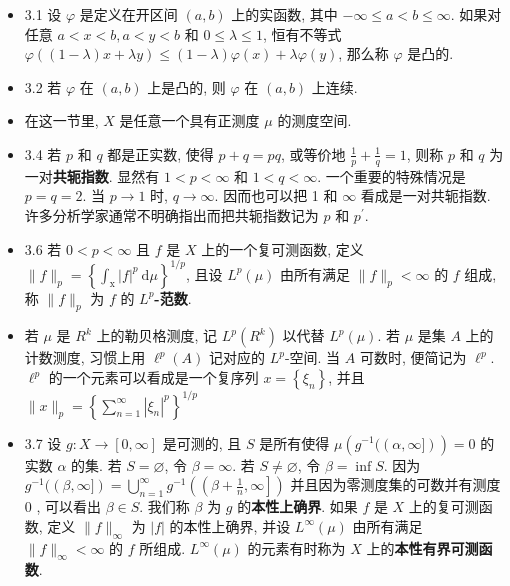 \begin{itemize}
\item 3.1 设 $\varphi$ 是定义在开区间 $(a, b)$ 上的实函数, 其中 $-\infty \leqslant a<b \leqslant \infty$. 如果对任意 $a<x<b, a<y<b$ 和 $0 \leqslant \lambda \leqslant 1$, 恒有不等式 $\varphi((1-\lambda) x+\lambda y) \leqslant(1-\lambda) \varphi(x)+\lambda \varphi(y)$, 那么称 $\varphi$ 是凸的.

\item 3.2 若 $\varphi$ 在 $(a, b)$ 上是凸的, 则 $\varphi$ 在 $(a, b)$ 上连续.

\item 在这一节里, $X$ 是任意一个具有正测度 $\mu$ 的测度空间.

\item 3.4 若 $p$ 和 $q$ 都是正实数, 使得 $p+q=p q$, 或等价地 $\frac{1}{p}+\frac{1}{q}=1$, 则称 $p$ 和 $q$ 为一对\textbf{共轭指数}. 显然有 $1<p<\infty$ 和 $1<q<\infty$. 一个重要的特殊情况是 $p=q=2$. 当 $p \rightarrow 1$ 时, $q \rightarrow \infty$. 因而也可以把 1 和 $\infty$ 看成是一对共轭指数. 许多分析学家通常不明确指出而把共轭指数记为 $p$ 和 $p^{\prime}$.

\item 3.6 若 $0<p<\infty$ 且 $f$ 是 $X$ 上的一个复可测函数, 定义 $\|f\|_{p}=\left\{\int_{\mathrm{x}}|f|^{p} \mathrm{~d} \mu\right\}^{1 / p}$, 且设 $L^{p}(\mu)$ 由所有满足 $\|f\|_{p}<\infty$ 的 $f$ 组成, 称 $\|f\|_{p}$ 为 $f$ 的 \textbf{$L^{p}$-范数}.

\item 若 $\mu$ 是 $R^{k}$ 上的勒贝格测度, 记 $L^{p}\left(R^{k}\right)$ 以代替 $L^{p}(\mu)$. 若 $\mu$ 是集 $A$ 上的计数测度, 习惯上用 $\ell^{p}(A)$ 记对应的 $L^{p}$-空间. 当 $A$ 可数时, 便简记为 $\ell^{p}$. $\ell^{p}$ 的一个元素可以看成是一个复序列 $x=\left\{\xi_{n}\right\}$, 并且 $\|x\|_{p}=\left\{\sum_{n=1}^{\infty}\left|\xi_{n}\right|^{p}\right\}^{1 / p}$

\item 3.7 设 $g: X \rightarrow[0, \infty]$ 是可测的, 且 $S$ 是所有使得 $\mu\left(g^{-1}((\alpha, \infty])\right)=0$ 的实数 $\alpha$ 的集. 若 $S=\varnothing$, 令 $\beta=\infty$. 若 $S \neq \varnothing$, 令 $\beta=\inf S$. 因为 $g^{-1}((\beta, \infty])=\bigcup_{n=1}^{\infty} g^{-1}\left(\left(\beta+\frac{1}{n}, \infty\right]\right)$ 并且因为零测度集的可数并有测度 0 , 可以看出 $\beta \in S$. 我们称 $\beta$ 为 $g$ 的\textbf{本性上确界}. 如果 $f$ 是 $X$ 上的复可测函数, 定义 $\|f\|_{\infty}$ 为 $|f|$ 的本性上确界, 并设 $L^{\infty}(\mu)$ 由所有满足 $\|f\|_{\infty}<\infty$ 的 $f$ 所组成. $L^{\infty}(\mu)$ 的元素有时称为 $X$ 上的\textbf{本性有界可测函数}.


\end{itemize}
